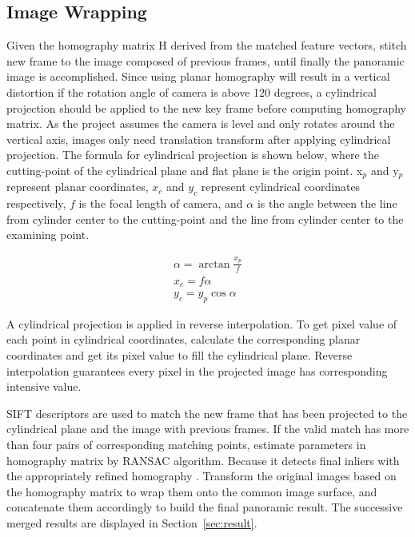 \documentclass[runningheads]{llncs}
\begin{document}
\subsection{Image Wrapping}

Given the homography matrix $\mathrm{H}$ derived from the matched feature vectors, stitch new frame to the image composed of previous frames, until finally the panoramic image is accomplished. Since using planar homography will result in a vertical distortion if the rotation angle of camera is above 120 degrees, a cylindrical projection should be applied to the new key frame before computing homography matrix. As the project assumes the camera is level and only rotates around the vertical axis, images only need translation transform after applying cylindrical projection. The formula for cylindrical projection is shown below, where the cutting-point of the cylindrical plane and flat plane is the origin point. x$_{p}$ and y$_{p}$ represent planar coordinates, $x_{c}$ and $y_{c}$ represent cylindrical coordinates respectively, $f$ is the focal length of camera, and $\alpha$ is the angle between the line from cylinder center to the cutting-point and the line from cylinder center to the examining point.

\begin{gather}
  \alpha =\arctan\frac{x_p}{f} \\
  x_c = f \alpha \\
  y_c = y_p \cos\alpha
\end{gather}

A cylindrical projection is applied in reverse interpolation. To get pixel value of each point in cylindrical coordinates, calculate the corresponding planar coordinates and get its pixel value to fill the cylindrical plane. Reverse interpolation guarantees every pixel in the projected image has corresponding intensive value.

SIFT descriptors are used to match the new frame that has been projected to the cylindrical plane and the image with previous frames. If the valid match has more than four pairs of corresponding matching points, estimate parameters in homography matrix by RANSAC algorithm. Because it detects final inliers with the appropriately refined homography \cite{wu2007improved}. Transform the original images based on the homography matrix to wrap them onto the common image surface, and concatenate them accordingly to build the final panoramic result. The successive merged results are displayed in Section~\ref{sec:result}.
\end{document}
